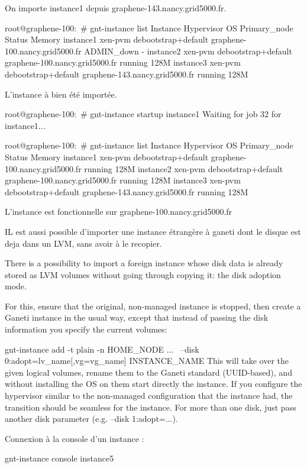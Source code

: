 On importe instance1 depuis graphene-143.nancy.grid5000.fr.

root@graphene-100:~# gnt-instance list
Instance  Hypervisor OS                  Primary_node                   Status     Memory
instance1 xen-pvm    debootstrap+default graphene-100.nancy.grid5000.fr ADMIN_down      -
instance2 xen-pvm    debootstrap+default graphene-100.nancy.grid5000.fr running      128M
instance3 xen-pvm    debootstrap+default graphene-143.nancy.grid5000.fr running      128M

L'instance à bien été importée.

root@graphene-100:~# gnt-instance startup instance1
Waiting for job 32 for instance1...

root@graphene-100:~# gnt-instance list
Instance  Hypervisor OS                  Primary_node                   Status  Memory
instance1 xen-pvm    debootstrap+default graphene-100.nancy.grid5000.fr running   128M
instance2 xen-pvm    debootstrap+default graphene-100.nancy.grid5000.fr running   128M
instance3 xen-pvm    debootstrap+default graphene-143.nancy.grid5000.fr running   128M

L'instance est fonctionnelle sur graphene-100.nancy.grid5000.fr


IL est aussi possible d'importer une instance étrangère à ganeti dont le disque est deja dans un LVM, sans avoir à le recopier.

There is a possibility to import a foreign instance whose disk data is already stored as LVM volumes without going through copying it: the disk adoption mode.

For this, ensure that the original, non-managed instance is stopped, then create a Ganeti instance in the usual way, except that instead of passing the disk information you specify the current volumes:

gnt-instance add -t plain -n HOME_NODE ... \
  --disk 0:adopt=lv_name[,vg=vg_name] INSTANCE_NAME
  This will take over the given logical volumes, rename them to the Ganeti standard (UUID-based), and without installing the OS on them start directly the instance. If you configure the hypervisor similar to the non-managed configuration that the instance had, the transition should be seamless for the instance. For more than one disk, just pass another disk parameter (e.g. --disk 1:adopt=...).

Connexion à la console d'un instance :

gnt-instance console instance5



